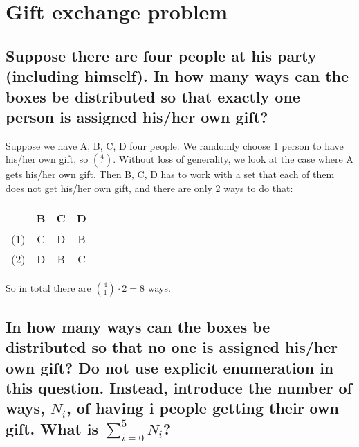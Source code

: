 \documentclass{article}
\begin{document}
\section{Gift exchange problem}

\subsection{Suppose there are four people at his party (including himself). In how many ways can the boxes
be distributed so that exactly one person is assigned his/her own gift?}
Suppose we have A, B, C, D four people. We randomly choose 1 person to have his/her own gift, so \({4 \choose 1}\). 
Without loss of generality, we look at the case where A gets his/her own gift. Then B, C, D has to work with a set that each of them does not get his/her own gift, and there are only 2 ways to do that:
\begin{center}
\begin{tabular}{ |c|c|c|c| } 
 \hline
 & B & C & D \\ 
 \hline
 (1) & C & D & B \\ 
 (2) & D & B & C \\ 
 \hline
\end{tabular}
\end{center}
So in total there are \( {4 \choose 1} \cdot 2 = 8\) ways.

\subsection{In how many ways can the boxes be distributed so that no one is assigned his/her own gift? Do not use explicit enumeration in this question. Instead, introduce the number of ways, \(N_i\), of having i people getting their own gift. What is \( \sum_{i=0}^{5} N_i \)?}
\end{document}
